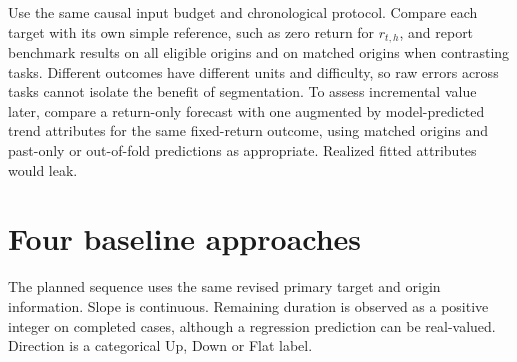 \documentclass[10pt,letterpaper]{article}
\begin{document}
Use the same causal input budget and chronological protocol. Compare each target with its own simple reference, such as zero return for \(r_{t,h}\), and report benchmark results on all eligible origins and on matched origins when contrasting tasks. Different outcomes have different units and difficulty, so raw errors across tasks cannot isolate the benefit of segmentation. To assess incremental value later, compare a return-only forecast with one augmented by model-predicted trend attributes for the same fixed-return outcome, using matched origins and past-only or out-of-fold predictions as appropriate. Realized fitted attributes would leak.\par

\section{Four baseline approaches}

The planned sequence uses the same revised primary target and origin information. Slope is continuous. Remaining duration is observed as a positive integer on completed cases, although a regression prediction can be real-valued. Direction is a categorical Up, Down or Flat label.\par

\par{}\par\smallskip
\end{document}
